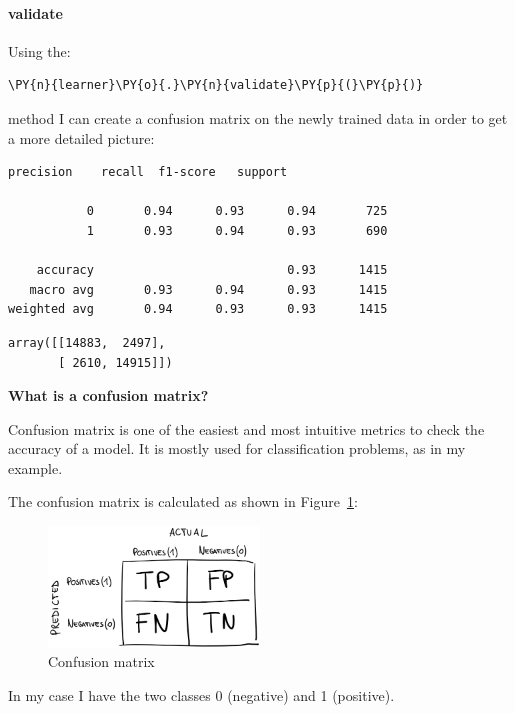 \paragraph{validate}
Using the:
    \begin{tcolorbox}[breakable, size=fbox, boxrule=1pt, pad at break*=1mm,colback=cellbackground, colframe=cellborder]
\begin{Verbatim}[commandchars=\\\{\},fontsize=\footnotesize]
\PY{n}{learner}\PY{o}{.}\PY{n}{validate}\PY{p}{(}\PY{p}{)}
\end{Verbatim}
\end{tcolorbox}method I can create a confusion matrix on the newly trained data in order to get a more detailed picture:
    \begin{Verbatim}[commandchars=\\\{\},fontsize=\footnotesize]
              precision    recall  f1-score   support

           0       0.94      0.93      0.94       725
           1       0.93      0.94      0.93       690

    accuracy                           0.93      1415
   macro avg       0.93      0.94      0.93      1415
weighted avg       0.94      0.93      0.93      1415

    \end{Verbatim}
            \begin{tcolorbox}[breakable, size=fbox, boxrule=.5pt, pad at break*=1mm, opacityfill=0]
\begin{Verbatim}[commandchars=\\\{\},fontsize=\footnotesize]
array([[14883,  2497],
       [ 2610, 14915]])
\end{Verbatim}
\end{tcolorbox}


\textbf{What is a confusion matrix?}

Confusion matrix is one of the easiest and most intuitive metrics to check the accuracy of a model.
It is mostly used for classification problems, as in my example.

The confusion matrix is calculated as shown in Figure~\ref{fig:fig_cm}:
\begin{figure}[ht!]
\centering
\includegraphics[width=0.5\textwidth]{images/cm.png}
\caption{Confusion matrix}
\label{fig:fig_cm}
\end{figure}
\FloatBarrier
In my case I have the two classes 0 (negative) and 1 (positive).

